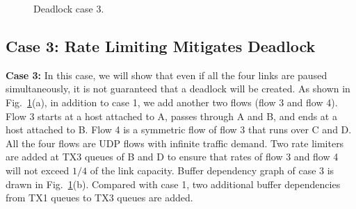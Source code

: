 \begin{figure}[t]

\caption{Deadlock case 3.}\label{fig:case3}

\end{figure}

\subsection{Case 3: Rate Limiting Mitigates Deadlock}

\textbf{Case 3:} In this case, we will show that even if all the four links are paused simultaneously, 
it is not guaranteed that a deadlock will be created. As shown in Fig.~\ref{fig:case3}(a), in addition 
to case 1, we add another two flows (flow 3 and flow 4). Flow 3 starts at a host attached to A, passes 
through A and B, and ends at a host attached to B. Flow 4 is a symmetric flow of flow 3 that runs over 
C and D. All the four flows are UDP flows with infinite traffic demand. Two rate limiters are added at 
TX3 queues of B and D to ensure that rates of flow 3 and flow 4 will not exceed $1/4$ of the link 
capacity. Buffer dependency graph of case 3 is drawn in Fig.~\ref{fig:case3}(b). Compared with case 1, 
two additional buffer dependencies from TX1 queues to TX3 queues are added.

